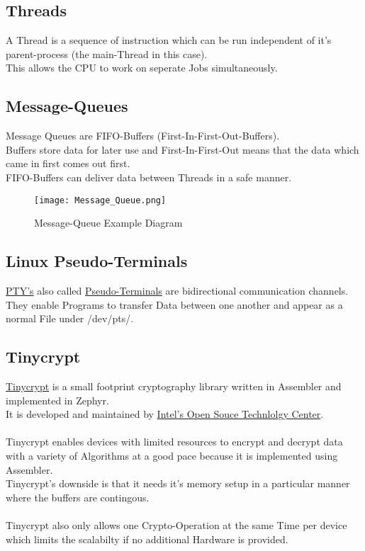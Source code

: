 \subsection{Threads}

A Thread is a sequence of instruction which can be run
independent of it's parent-process (the main-Thread in this case).
\\
This allows the CPU to work on seperate Jobs simultaneously.

\subsection{Message-Queues}

Message Queues are FIFO-Buffers (First-In-First-Out-Buffers).
\\
Buffers store data for later use and First-In-First-Out means
that the data which came in first comes out first.
\\
FIFO-Buffers can deliver data between Threads in a safe manner.

\begin{figure}[!ht]
	\begin{center}
		\texttt{[image: Message\_Queue.png]}
		\caption{Message-Queue Example Diagram}
	\end{center}
\end{figure}

\subsection{Linux Pseudo-Terminals}

\href{https://linux.die.net/man/7/pty}
{PTY's} also called
\href{https://linux.die.net/man/7/pty}
{Pseudo-Terminals} are bidirectional communication channels.
They enable Programs to transfer Data between one another
and appear as a normal File under /dev/pts/.

\subsection{Tinycrypt}

\href{https://01.org/tinycrypt}
{Tinycrypt} is a small footprint cryptography library written
in Assembler and implemented in Zephyr.
\\
It is developed and maintained by
\href{https://01.org/}
{Intel's Open Souce Technlolgy Center}.
\\
\\
Tinycrypt enables devices with limited resources to encrypt and decrypt data
with a variety of Algorithms at a good pace because it is implemented using
Assembler.
\\
Tinycrypt's downside is that it needs it's memory setup in a particular manner
where the buffers are contingous.
\\
\\
Tinycrypt also only allows one Crypto-Operation at the same Time per device
which limits the scalabilty if no additional Hardware is provided.

